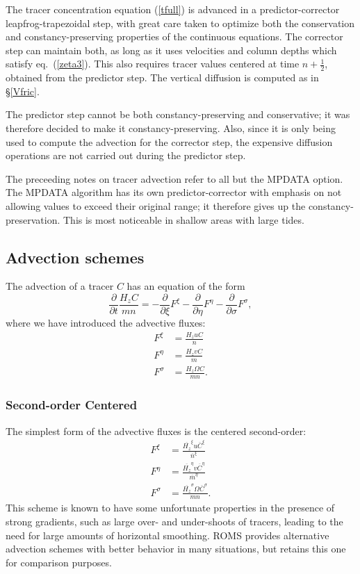 The tracer concentration equation (\ref{tfull}) is advanced in a
predictor-corrector leapfrog-trapezoidal step, with great care taken to
optimize both the conservation and constancy-preserving properties of the
continuous equations. The corrector step can maintain both, as long as it
uses velocities and column depths which satisfy eq.~(\ref{zeta3}). This
also requires tracer values centered at time $n+\frac{1}{2}$, obtained
from the predictor step. The vertical diffusion is computed as in
\S\ref{Vfric}.

The predictor step cannot be both constancy-preserving and conservative; it
was therefore decided to make it constancy-preserving. Also, since it is
only being used to compute the advection for the corrector step, the
expensive diffusion operations are not carried out during the predictor step.

The preceeding notes on tracer advection refer to all but the MPDATA
option. The MPDATA algorithm has its own predictor-corrector with
emphasis on not allowing values to exceed their original range;
it therefore gives up the constancy-preservation. This is most
noticeable in shallow areas with large tides.

\subsection{Advection schemes}
\label{Advect}
The advection of a tracer $C$ has an equation of the form
\begin{equation}
  \frac{\partial}{\partial t} \frac{ H_z C}{mn} =
  - \frac{\partial}{\partial \xi} F^\xi
  - \frac{\partial}{\partial \eta} F^\eta
  - \frac{\partial}{\partial \sigma} F^\sigma ,
\end{equation}
where we have introduced the advective fluxes:
\begin{align}
   F^\xi &= \frac{H_z u C}{n} \\
   F^\eta &= \frac{H_z v C}{m} \\
   F^\sigma &= \frac{H_z \Omega C}{mn} .
\end{align}

\subsubsection{Second-order Centered}
The simplest form of the advective fluxes is the centered
second-order:
\begin{align}
   F^\xi &= \frac{\overline{H_z}^\xi u
               \overline{C}^\xi}{\overline{n}^\xi} \\
   F^\eta &= \frac{\overline{H_z}^\eta v
               \overline{C}^\eta}{\overline{m}^\eta} \\
   F^\sigma &= \frac{\overline{H_z}^\sigma \Omega
               \overline{C}^\sigma}{mn} .
\end{align}
This scheme is known to have some unfortunate
properties in the presence of strong gradients, such as large over- and
under-shoots of tracers, leading to the need for large amounts of
horizontal smoothing. ROMS provides alternative advection
schemes with better behavior in many situations, but retains this
one for comparison purposes.

